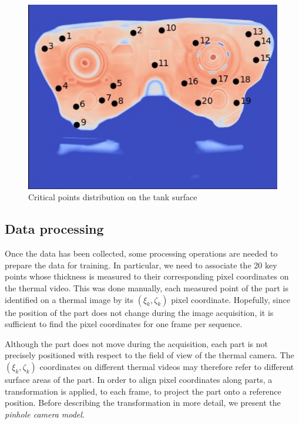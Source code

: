 \begin{figure}
\centering
\includegraphics[scale=1]{images/chapter_4/critical_points.jpg}
\caption{Critical points distribution on the tank surface}
\label{fig:critical_points}
\end{figure}

\subsection{Data processing}

Once the data has been collected, some processing operations are needed to prepare the data for training. In particular, we need to associate the 20 key points whose thickness is measured to their corresponding pixel coordinates on the thermal video. This was done manually, each measured point of the part is identified on a thermal image by its $(\xi_{k}, \zeta_{k})$ pixel coordinate. Hopefully, since the position of the part does not change during the image acquisition, it is sufficient to find the pixel coordinates for one frame per sequence. 

Although the part does not move during the acquisition, each part is not precisely positioned with respect to the field of view of the thermal camera. The  $(\xi_{k}, \zeta_{k})$ coordinates on different thermal videos may therefore refer to different surface areas of the part. In order to align pixel coordinates along parts, a transformation is applied, to each frame, to project the part onto a reference position. Before describing the transformation in more detail, we present the \textit{pinhole camera model}. 

